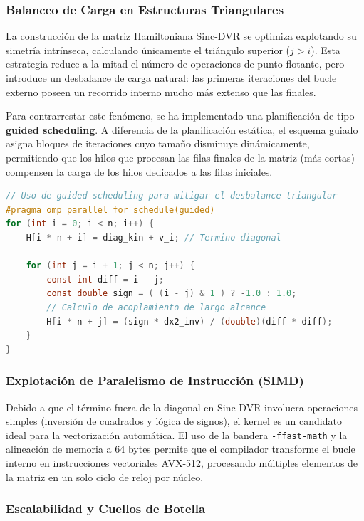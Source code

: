 \documentclass[11pt,fleqn]{article}
\begin{document}
\subsubsection{Balanceo de Carga en Estructuras Triangulares}

La construcción de la matriz Hamiltoniana Sinc-DVR se optimiza explotando su simetría intrínseca, calculando únicamente el triángulo superior ($j > i$). Esta estrategia reduce a la mitad el número de operaciones de punto flotante, pero introduce un desbalance de carga natural: las primeras iteraciones del bucle externo poseen un recorrido interno mucho más extenso que las finales.

Para contrarrestar este fenómeno, se ha implementado una planificación de tipo \textbf{guided scheduling}. A diferencia de la planificación estática, el esquema guiado asigna bloques de iteraciones cuyo tamaño disminuye dinámicamente, permitiendo que los hilos que procesan las filas finales de la matriz (más cortas) compensen la carga de los hilos dedicados a las filas iniciales.

\begin{lstlisting}[language=C, caption=Construcción de matriz densa Sinc-DVR con balanceo dinámico]
// Uso de guided scheduling para mitigar el desbalance triangular
#pragma omp parallel for schedule(guided)
for (int i = 0; i < n; i++) {
    H[i * n + i] = diag_kin + v_i; // Termino diagonal

    for (int j = i + 1; j < n; j++) {
        const int diff = i - j;
        const double sign = ( (i - j) & 1 ) ? -1.0 : 1.0;
        // Calculo de acoplamiento de largo alcance
        H[i * n + j] = (sign * dx2_inv) / (double)(diff * diff);
    }
}
\end{lstlisting}

\subsubsection{Explotación de Paralelismo de Instrucción (SIMD)}

Debido a que el término fuera de la diagonal en Sinc-DVR involucra operaciones simples (inversión de cuadrados y lógica de signos), el kernel es un candidato ideal para la vectorización automática. El uso de la bandera \texttt{-ffast-math} y la alineación de memoria a 64 bytes permite que el compilador transforme el bucle interno en instrucciones vectoriales AVX-512, procesando múltiples elementos de la matriz en un solo ciclo de reloj por núcleo.

\subsubsection{Escalabilidad y Cuellos de Botella}
\end{document}
